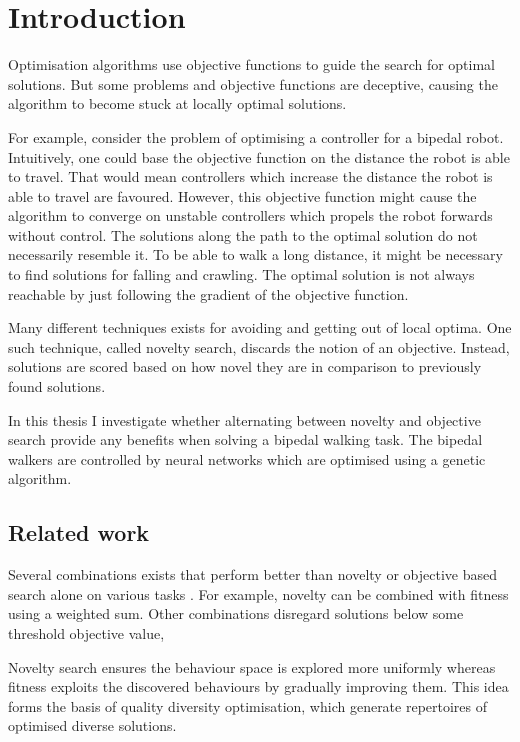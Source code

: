 \section{Introduction}

\label{sec:intro}

Optimisation algorithms use objective functions to guide the search for optimal solutions.
But some problems and objective functions are deceptive, causing the algorithm to become stuck at
locally optimal solutions.

For example, consider the problem of optimising a controller for a bipedal
robot. Intuitively, one could base the objective function on the distance the robot is able to travel.
That would mean controllers which increase the distance the robot is able to travel are favoured.
However, this objective function might cause the algorithm to converge on unstable controllers which
propels the robot forwards without control. The solutions along the path to the optimal solution
do not necessarily resemble it. To be able to walk a long distance, it might be necessary to find
solutions for falling and crawling. The optimal solution is not always reachable by just
following the gradient of the objective function.

Many different techniques exists for avoiding and getting out of local optima. One such technique, called
novelty search, discards the notion of an objective. Instead, solutions are scored based on how novel
they are in comparison to previously found solutions.

In this thesis I investigate whether alternating between novelty and objective search provide any
benefits when solving a bipedal walking task. The bipedal walkers are controlled by neural networks
which are optimised using a genetic algorithm.

\todo{}


\subsection{Related work}
Several combinations exists that perform better than novelty or objective based search alone
on various tasks \cite{ns_study}. For example, novelty
can be combined with fitness using a weighted sum. Other combinations disregard solutions
below some threshold objective value,


Novelty search ensures the behaviour space is explored more uniformly whereas fitness exploits the discovered behaviours
by gradually improving them. This idea forms the basis of quality diversity optimisation,
which generate repertoires of optimised diverse solutions.

